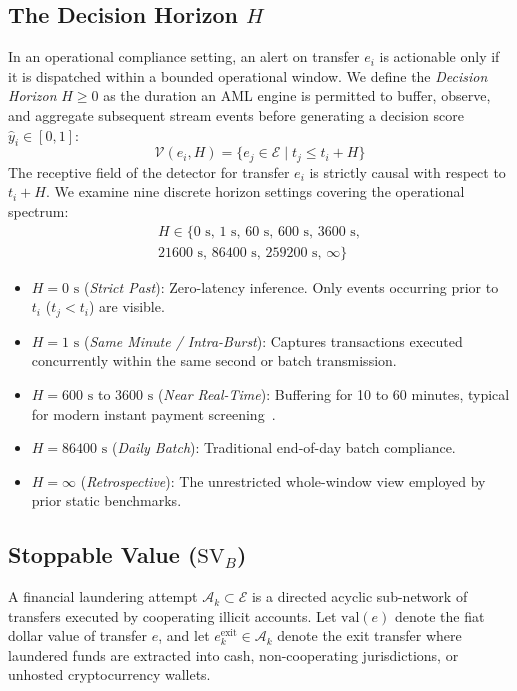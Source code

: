 \documentclass[10pt,twocolumn,letterpaper]{article}
\begin{document}
\subsection{The Decision Horizon $H$}
In an operational compliance setting, an alert on transfer $e_i$ is actionable only if it is dispatched within a bounded operational window. We define the \emph{Decision Horizon} $H \ge 0$ as the duration an AML engine is permitted to buffer, observe, and aggregate subsequent stream events before generating a decision score $\hat{y}_i \in [0, 1]$:
\begin{equation}
\mathcal{V}(e_i, H) = \{e_j \in \mathcal{E} \mid t_j \le t_i + H\}
\end{equation}
The receptive field of the detector for transfer $e_i$ is strictly causal with respect to $t_i + H$. We examine nine discrete horizon settings covering the operational spectrum:
\begin{multline}
H \in \{0\text{ s}, \, 1\text{ s}, \, 60\text{ s}, \, 600\text{ s}, \, 3600\text{ s}, \\
        21600\text{ s}, \, 86400\text{ s}, \, 259200\text{ s}, \, \infty\}
\end{multline}
\begin{itemize}[leftmargin=*]
    \item $H=0\text{ s}$ (\emph{Strict Past}): Zero-latency inference. Only events occurring prior to $t_i$ ($t_j < t_i$) are visible.
    \item $H=1\text{ s}$ (\emph{Same Minute / Intra-Burst}): Captures transactions executed concurrently within the same second or batch transmission.
    \item $H=600\text{ s}$ to $3600\text{ s}$ (\emph{Near Real-Time}): Buffering for 10 to 60 minutes, typical for modern instant payment screening~\cite{eu2024instant}.
    \item $H=86400\text{ s}$ (\emph{Daily Batch}): Traditional end-of-day batch compliance.
    \item $H=\infty$ (\emph{Retrospective}): The unrestricted whole-window view employed by prior static benchmarks.
\end{itemize}

\subsection{Stoppable Value ($\text{SV}_B$)}
A financial laundering attempt $\mathcal{A}_k \subset \mathcal{E}$ is a directed acyclic sub-network of transfers executed by cooperating illicit accounts. Let $\text{val}(e)$ denote the fiat dollar value of transfer $e$, and let $e_k^{\text{exit}} \in \mathcal{A}_k$ denote the exit transfer where laundered funds are extracted into cash, non-cooperating jurisdictions, or unhosted cryptocurrency wallets.
\end{document}
